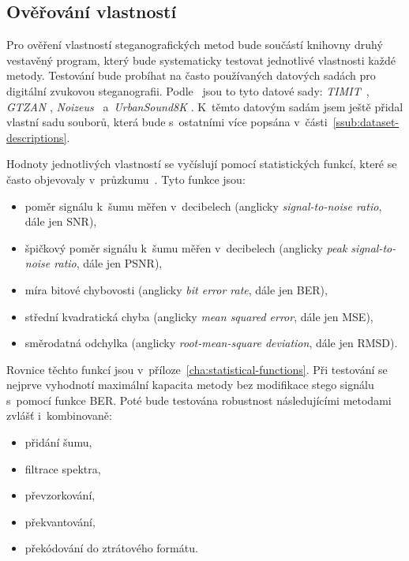 \subsection*{Ověřování vlastností}
\label{sub:method-property-verification}

Pro ověření vlastností steganografických metod bude součástí knihovny druhý
vestavěný program, který bude systematicky testovat jednotlivé vlastnosti každé
metody. Testování bude probíhat na často používaných datových sadách pro
digitální zvukovou steganografii. Podle~\cite{AlSabhany2020} jsou to tyto
datové sady: \textit{TIMIT}~\cite{Garofolo1993}, \textit{GTZAN}
\cite{Tzanetakis2001}, \textit{Noizeus}~\cite{Hu2006} a~\textit{UrbanSound8K}
\cite{Salamon2014}. K~těmto datovým sadám jsem ještě přidal vlastní sadu
souborů, která bude s~ostatními více popsána
v~části~\ref{ssub:dataset-descriptions}.

Hodnoty jednotlivých vlastností se vyčíslují pomocí statistických funkcí, které
se často objevovaly v~průzkumu~\cite{AlSabhany2020}. Tyto funkce jsou:

\begin{itemize}
    \item poměr signálu k~šumu měřen v~decibelech (anglicky
        \textit{signal-to-noise ratio}, dále jen SNR),
    \item špičkový poměr signálu k~šumu měřen v~decibelech (anglicky
        \textit{peak signal-to-noise ratio}, dále jen PSNR),
    \item míra bitové chybovosti (anglicky \textit{bit error rate}, dále jen
        BER),
    \item střední kvadratická chyba (anglicky \textit{mean squared error}, dále
        jen MSE),
    \item směrodatná odchylka (anglicky \textit{root-mean-square deviation},
        dále jen RMSD).
\end{itemize}

\noindent Rovnice těchto funkcí jsou v~příloze~\ref{cha:statistical-functions}.
Při testování se nejprve vyhodnotí maximální kapacita metody bez modifikace
stego signálu s~pomocí funkce BER. Poté bude testována robustnost následujícími
metodami zvlášť i~kombinovaně:

\begin{itemize}
    \item přidání šumu,
    \item filtrace spektra,
    \item převzorkování,
    \item překvantování,
    \item překódování do ztrátového formátu.
\end{itemize}

